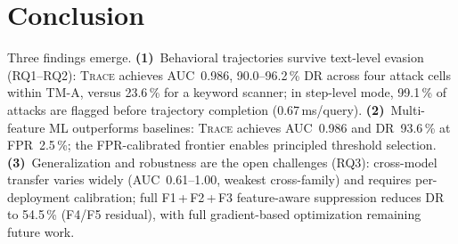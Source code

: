 \documentclass[conference]{IEEEtran}
\begin{document}
\section{Conclusion}
\label{sec:conclusion}

Three findings emerge.
\textbf{(1)}~Behavioral trajectories survive text-level evasion
(RQ1--RQ2): \textsc{Trace} achieves AUC~0.986, 90.0--96.2\,\% DR
across four attack cells within TM-A, versus 23.6\,\% for a keyword
scanner; in step-level mode, 99.1\,\% of attacks are flagged before
trajectory completion (0.67\,ms/query).
\textbf{(2)}~Multi-feature ML outperforms baselines: \textsc{Trace}
achieves AUC~0.986 and DR~93.6\,\% at FPR~2.5\,\%; the FPR-calibrated
frontier enables principled threshold selection.
\textbf{(3)}~Generalization and robustness are the open challenges
(RQ3): cross-model transfer varies widely (AUC~0.61--1.00, weakest
cross-family) and requires per-deployment calibration; full
F1\,+\,F2\,+\,F3 feature-aware suppression reduces DR to 54.5\,\%
(F4/F5 residual), with full gradient-based optimization remaining
future work.




\end{document}
